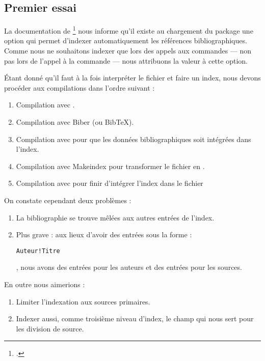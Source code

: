 \begin{bashcode}
\subsection{Premier essai}

La documentation de \footcite{biblatex_options} nous informe qu'il existe  au chargement du package une option  qui permet d'indexer automatiquement les références bibliographiques. Comme nous ne souhaitons indexer que lors des appels aux commandes   ---  non pas lors de l'appel à la commande  --- nous attribuons la valeur  à cette option. 

\begin{latexcode}
\usepackage[indexing=cite]{biblatex}
\end{latexcode}

Étant donné qu'il faut à la fois interpréter le fichier  et faire un index, nous devons procéder aux compilations dans l'ordre suivant :

\begin{enumerate}
\item Compilation avec \XeLaTeX.
\item Compilation avec Biber (ou BibTeX).
\item Compilation avec \XeLaTeX pour que les données bibliographiques soit intégrées dans l'index.
\item Compilation avec Makeindex pour transformer le fichier  en .
\item Compilation avec \XeLaTeX pour finir d'intégrer l'index dans le fichier 
\end{enumerate}

On constate cependant deux problèmes : 
\begin{enumerate}
\item La bibliographie se trouve mêlées aux autres entrées de l'index.
\item Plus grave : aux lieux d'avoir des entrées sous la forme : \begin{english}\verb|Auteur!Titre|\end{english}, nous avons des entrées pour les auteurs et des entrées pour les sources.
\end{enumerate}

En outre nous aimerions :
\begin{enumerate}
\item Limiter l'indexation aux sources primaires.
\item Indexer aussi, comme troisième niveau d'index, le champ  qui nous sert pour les division de source. 
\end{enumerate}


\end{bashcode}
